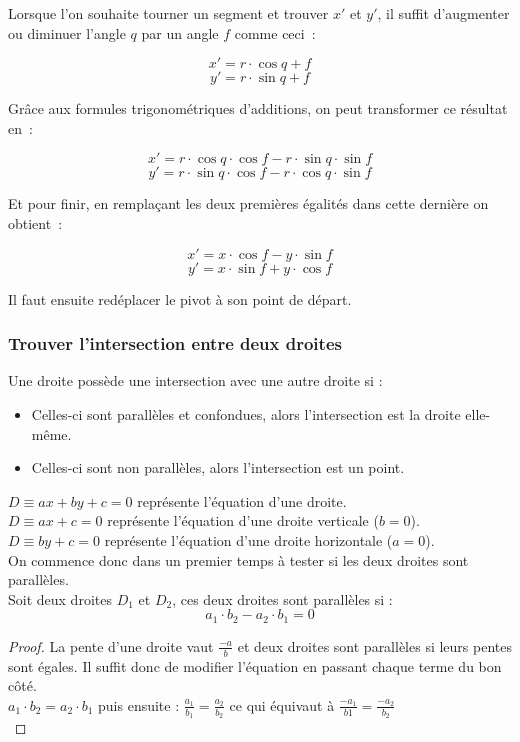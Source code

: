 \documentclass[]{report}
\begin{document}
Lorsque l'on souhaite tourner un segment et trouver $ x' $ et $ y' $, 
il suffit d'augmenter ou diminuer l'angle $ q $ par un angle $ f $ comme ceci~:

$$ x' = r \cdot \cos{q + f} $$
$$ y' = r \cdot \sin{q + f} $$

Grâce aux formules trigonométriques d'additions, on peut transformer ce résultat en~:

$$ x' = r \cdot \cos{q} \cdot \cos{f} - r \cdot \sin{q} \cdot \sin{f} $$
$$ y' = r \cdot \sin{q} \cdot \cos{f} - r \cdot \cos{q} \cdot \sin{f} $$

Et pour finir, en remplaçant les deux premières égalités dans cette dernière on obtient~: 

$$ x' = x \cdot \cos{f} - y \cdot \sin{f} $$
$$ y' = x \cdot \sin{f} + y \cdot \cos{f} $$

Il faut ensuite redéplacer le pivot à son point de départ.

\newpage
\subsubsection{\label{AnnexeIntersects}Trouver l'intersection entre deux droites}

Une droite possède une intersection avec une autre droite si :
\begin{itemize}
    \item Celles-ci sont parallèles et confondues, alors l'intersection est la droite elle-même.
    \item Celles-ci sont non parallèles, alors l'intersection est un point. \\
\end{itemize} 

$ D \equiv ax + by + c = 0 $ représente l'équation d'une droite. \\
$ D \equiv ax + c = 0 $ représente l'équation d'une droite verticale ($b = 0$). \\
$ D \equiv by + c = 0 $ représente l'équation d'une droite horizontale ($a = 0$). \\

On commence donc dans un premier temps à tester si les deux droites sont parallèles. \\

Soit deux droites $D_1$ et $D_2$, ces deux droites sont parallèles si : 
$$ a_1 \cdot b_2 - a_2 \cdot b_1 = 0 $$

\begin{proof}
La pente d'une droite vaut $\frac{-a}{b}$ et deux droites sont parallèles
si leurs pentes sont égales. Il suffit donc de modifier l'équation en passant chaque terme du bon côté. \\
$ a_1 \cdot b_2 = a_2 \cdot b_1 $ puis ensuite : $ \frac{a_1}{b_1} = \frac{a_2}{b_2} $ ce qui équivaut à
$ \frac{-a_1}{b1} = \frac{-a_2}{b_2} $ \\
\end{proof}
\end{document}
